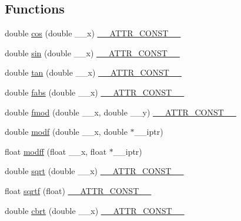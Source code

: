 \subsection*{Functions}
\begin{DoxyCompactItemize}
\item 
double \hyperlink{group__avr__math_gaab93da039c516fcee9be6efb7d4cdfb3}{cos} (double \+\_\+\+\_\+x) \hyperlink{group__avr__math_ga87f6b1b3880d945610873b9da382e5d4}{\+\_\+\+\_\+\+A\+T\+T\+R\+\_\+\+C\+O\+N\+S\+T\+\_\+\+\_\+}
\item 
double \hyperlink{group__avr__math_gaaf9cbe0a58b6fd6758e2d977aba46eb5}{sin} (double \+\_\+\+\_\+x) \hyperlink{group__avr__math_ga87f6b1b3880d945610873b9da382e5d4}{\+\_\+\+\_\+\+A\+T\+T\+R\+\_\+\+C\+O\+N\+S\+T\+\_\+\+\_\+}
\item 
double \hyperlink{group__avr__math_ga3aa121cf8eee9dc1647c0b83ebbd72e9}{tan} (double \+\_\+\+\_\+x) \hyperlink{group__avr__math_ga87f6b1b3880d945610873b9da382e5d4}{\+\_\+\+\_\+\+A\+T\+T\+R\+\_\+\+C\+O\+N\+S\+T\+\_\+\+\_\+}
\item 
double \hyperlink{group__avr__math_ga8045a0b219052cc0e90e74d07925f2b0}{fabs} (double \+\_\+\+\_\+x) \hyperlink{group__avr__math_ga87f6b1b3880d945610873b9da382e5d4}{\+\_\+\+\_\+\+A\+T\+T\+R\+\_\+\+C\+O\+N\+S\+T\+\_\+\+\_\+}
\item 
double \hyperlink{group__avr__math_gae20369249862b10d741eba7754bf733a}{fmod} (double \+\_\+\+\_\+x, double \+\_\+\+\_\+y) \hyperlink{group__avr__math_ga87f6b1b3880d945610873b9da382e5d4}{\+\_\+\+\_\+\+A\+T\+T\+R\+\_\+\+C\+O\+N\+S\+T\+\_\+\+\_\+}
\item 
double \hyperlink{group__avr__math_ga85861fee92c0904e9bb7a9875ee77579}{modf} (double \+\_\+\+\_\+x, double $\ast$\+\_\+\+\_\+iptr)
\item 
float \hyperlink{group__avr__math_gad180f98cb1dac86425c2f4df7faf2a15}{modff} (float \+\_\+\+\_\+x, float $\ast$\+\_\+\+\_\+iptr)
\item 
double \hyperlink{group__avr__math_gaac21324d984f0af0fb87a613efb69d77}{sqrt} (double \+\_\+\+\_\+x) \hyperlink{group__avr__math_ga87f6b1b3880d945610873b9da382e5d4}{\+\_\+\+\_\+\+A\+T\+T\+R\+\_\+\+C\+O\+N\+S\+T\+\_\+\+\_\+}
\item 
float \hyperlink{group__avr__math_ga64f14b85f83a522d1b611612027cfe5a}{sqrtf} (float) \hyperlink{group__avr__math_ga87f6b1b3880d945610873b9da382e5d4}{\+\_\+\+\_\+\+A\+T\+T\+R\+\_\+\+C\+O\+N\+S\+T\+\_\+\+\_\+}
\item 
double \hyperlink{group__avr__math_ga10e79401a84266cc52fed672a8bb4a41}{cbrt} (double \+\_\+\+\_\+x) \hyperlink{group__avr__math_ga87f6b1b3880d945610873b9da382e5d4}{\+\_\+\+\_\+\+A\+T\+T\+R\+\_\+\+C\+O\+N\+S\+T\+\_\+\+\_\+}

\end{DoxyCompactItemize}
